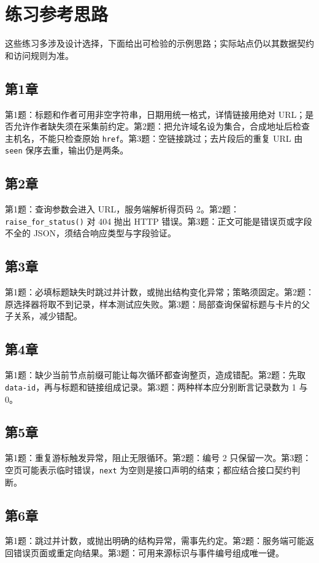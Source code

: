 \chapter{练习参考思路}\label{app:answers}
这些练习多涉及设计选择，下面给出可检验的示例思路；实际站点仍以其数据契约和访问规则为准。



\section*{第1章}
第1题：标题和作者可用非空字符串，日期用统一格式，详情链接用绝对 URL；是否允许作者缺失须在采集前约定。第2题：把允许域名设为集合，合成地址后检查主机名，不能只检查原始 \texttt{href}。第3题：空链接跳过；去片段后的重复 URL 由 \texttt{seen} 保序去重，输出仍是两条。

\section*{第2章}
第1题：查询参数会进入 URL，服务端解析得页码 2。第2题：\texttt{raise\_for\_status()} 对 404 抛出 HTTP 错误。第3题：正文可能是错误页或字段不全的 JSON，须结合响应类型与字段验证。

\section*{第3章}
第1题：必填标题缺失时跳过并计数，或抛出结构变化异常；策略须固定。第2题：原选择器将取不到记录，样本测试应失败。第3题：局部查询保留标题与卡片的父子关系，减少错配。

\section*{第4章}
第1题：缺少当前节点前缀可能让每次循环都查询整页，造成错配。第2题：先取 \texttt{data-id}，再与标题和链接组成记录。第3题：两种样本应分别断言记录数为 1 与 0。

\section*{第5章}
第1题：重复游标触发异常，阻止无限循环。第2题：编号 2 只保留一次。第3题：空页可能表示临时错误，\texttt{next} 为空则是接口声明的结束；都应结合接口契约判断。

\section*{第6章}
第1题：跳过并计数，或抛出明确的结构异常，需事先约定。第2题：服务端可能返回错误页面或重定向结果。第3题：可用来源标识与事件编号组成唯一键。

